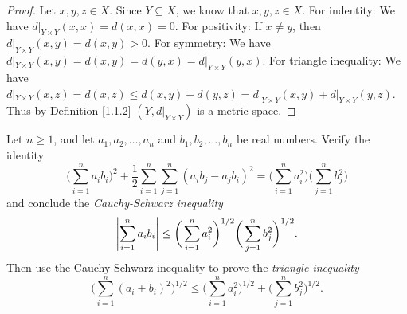 \begin{proof}
    Let \(x, y, z \in X\).
    Since \(Y \subseteq X\), we know that \(x, y, z \in X\).
    For indentity:
    We have \(d|_{Y \times Y}(x, x) = d(x, x) = 0\).
    For positivity:
    If \(x \neq y\), then \(d|_{Y \times Y}(x, y) = d(x, y) > 0\).
    For symmetry:
    We have \(d|_{Y \times Y}(x, y) = d(x, y) = d(y, x) = d|_{Y \times Y}(y, x)\).
    For triangle inequality:
    We have \(d|_{Y \times Y}(x, z) = d(x, z) \leq d(x, y) + d(y, z) = d|_{Y \times Y}(x, y) + d|_{Y \times Y}(y, z)\).
    Thus by Definition \ref{1.1.2} \((Y, d|_{Y \times Y})\) is a metric space.
\end{proof}

\begin{exercise}\label{ex 1.1.5}
    Let \(n \geq 1\), and let \(a_1, a_2, \dots, a_n\) and \(b_1, b_2, \dots, b_n\) be real numbers.
    Verify the identity
    \[
        \bigg(\sum_{i = 1}^n a_i b_i\bigg)^2 + \frac{1}{2} \sum_{i = 1}^n \sum_{j = 1}^n (a_i b_j - a_j b_i)^2 = \bigg(\sum_{i = 1}^n a_i^2\bigg) \bigg(\sum_{j = 1}^n b_j^2\bigg)
    \]
    and conclude the \emph{Cauchy-Schwarz inequality}
    \[
        \abs*{\sum_{i = 1}^n a_i b_i} \leq \bigg(\sum_{i = 1}^n a_i^2\bigg)^{1 / 2} \bigg(\sum_{j = 1}^n b_j^2\bigg)^{1 / 2}.
    \]
    Then use the Cauchy-Schwarz inequality to prove the \emph{triangle inequality}
    \[
        \bigg(\sum_{i = 1}^n (a_i + b_i)^2\bigg)^{1 / 2} \leq \bigg(\sum_{i = 1}^n a_i^2\bigg)^{1 / 2} + \bigg(\sum_{j = 1}^n b_j^2\bigg)^{1 / 2}.
    \]
\end{exercise}

